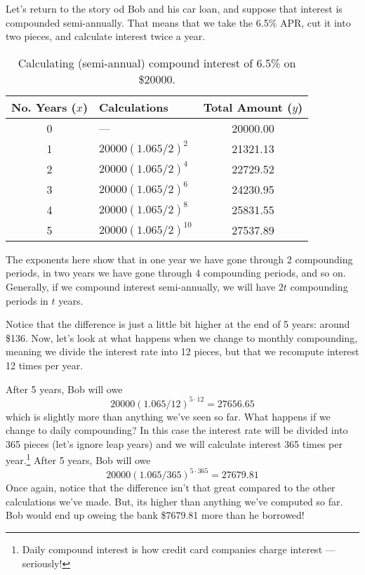 Let's return to the story od Bob and his car loan, and suppose that interest is compounded semi-annually. That means that we take the 6.5\% APR, cut it into two pieces, and calculate interest twice a year.

\begin{table}[!htbp]
\centering
\begin{tabular}{clc}
No. Years ($x$) & Calculations & Total Amount ($y$)\\\hline
0 & --- & 20000.00\\
1 		& $20000(1.065/2)^2$	 & 21321.13\\
2 		& $20000(1.065/2)^4$	 & 22729.52\\
3 		& $20000(1.065/2)^6$	 & 24230.95\\
4 		& $20000(1.065/2)^8$	 & 25831.55\\
5 		& $20000(1.065/2)^{10}$	 & 27537.89\\
\end{tabular}
\caption{Calculating (semi-annual) compound interest of 6.5\% on \$20000.}
\label{table:bobsemiannual}
\end{table}

The exponents here show that in one year we have gone through 2 compounding periods, in two years we have gone through 4 compounding periods, and so on. Generally, if we compound interest semi-annually, we will have $2t$ compounding periods in $t$ years.

Notice that the difference is just a little bit higher at the end of 5 years: around \$136. Now, let's look at what happens when we change to monthly compounding, meaning we divide the interest rate into 12 pieces, but that we recompute interest 12 times per year.

After 5 years, Bob will owe
\[20000(1.065/12)^{5\cdot12} = 27656.65\]
which is slightly more than anything we've seen so far. What happens if we change to daily compounding? In this case the interest rate will be divided into 365 pieces (let's ignore leap years) and we will calculate interest 365 times per year.\footnote{Daily compound interest is how credit card companies charge interest --- seriously!} After 5 years, Bob will owe
\[20000(1.065/365)^{5\cdot365} = 27679.81\]
Once again, notice that the difference isn't that great compared to the other calculations we've made. But, its higher than anything we've computed so far. Bob would end up oweing the bank \$7679.81 more than he borrowed!


